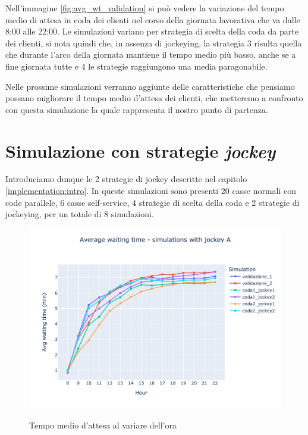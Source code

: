 Nell'immagine \ref{fig:avg_wt_validation} si può vedere la variazione del tempo medio di attesa in coda dei clienti nel corso della giornata lavorativa che va dalle 8:00 alle 22:00. Le simulazioni variano per strategia di scelta della coda da parte dei clienti, si nota quindi che, in assenza di jockeying, la strategia 3 risulta quella che durante l'arco della giornata mantiene il tempo medio più basso, anche se a fine giornata tutte e 4 le strategie raggiungono una media paragonabile.

Nelle prossime simulazioni verranno aggiunte delle caratteristiche che pensiamo possano migliorare il tempo medio d'attesa dei clienti, che metteremo a confronto con questa simulazione la quale rappresenta il nostro punto di partenza.

\section{Simulazione con strategie \textit{jockey}}

Introduciamo dunque le 2 strategie di jockey descritte nel capitolo \ref{implementation:intro}. In queste simulazioni sono presenti 20 casse normali con code parallele, 6 casse self-service, 4 strategie di scelta della coda e 2 strategie di jockeying, per un totale di 8 simulazioni.

\begin{figure}[H]
	\centering
	\includegraphics[width=12cm]{"images/results/avg_wt_jockey_a.png"}
	\label{fig:avg_wt_jockey_a}
	\caption{Tempo medio d'attesa al variare dell'ora}
\end{figure}

